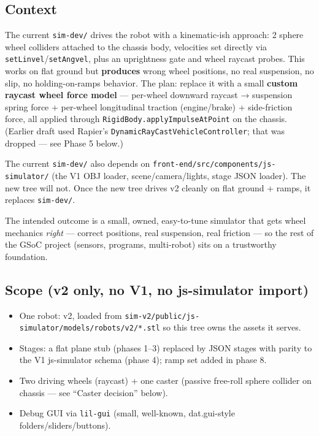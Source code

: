 \documentclass[
]{article}
\providecommand{\tightlist}{%
  \setlength{\itemsep}{0pt}\setlength{\parskip}{0pt}}
\begin{document}
\subsection{Context}\label{context}

The current \texttt{sim-dev/} drives the robot with a kinematic-ish
approach: 2 sphere wheel colliders attached to the chassis body,
velocities set directly via \texttt{setLinvel}/\texttt{setAngvel}, plus
an uprightness gate and wheel raycast probes. This works on flat ground
but \textbf{produces} wrong wheel positions, no real suspension, no
slip, no holding-on-ramps behavior. The plan: replace it with a small
\textbf{custom raycast wheel force model} --- per-wheel downward raycast
→ suspension spring force + per-wheel longitudinal traction
(engine/brake) + side-friction force, all applied through
\texttt{RigidBody.applyImpulseAtPoint} on the chassis. (Earlier draft
used Rapier's \texttt{DynamicRayCastVehicleController}; that was dropped
--- see Phase 5 below.)

The current \texttt{sim-dev/} also depends on
\texttt{front-end/src/components/js-simulator/} (the V1 OBJ loader,
scene/camera/lights, stage JSON loader). The new tree will not. Once the
new tree drives v2 cleanly on flat ground + ramps, it replaces
\texttt{sim-dev/}.

The intended outcome is a small, owned, easy-to-tune simulator that gets
wheel mechanics \emph{right} --- correct positions, real suspension,
real friction --- so the rest of the GSoC project (sensors, programs,
multi-robot) sits on a trustworthy foundation.

\subsection{Scope (v2 only, no V1, no js-simulator
import)}\label{scope-v2-only-no-v1-no-js-simulator-import}

\begin{itemize}
\tightlist
\item
  One robot: v2, loaded from
  \texttt{sim-v2/public/js-simulator/models/robots/v2/*.stl} so this
  tree owns the assets it serves.
\item
  Stages: a flat plane stub (phases 1--3) replaced by JSON stages with
  parity to the V1 js-simulator schema (phase 4); ramp set added in
  phase 8.
\item
  Two driving wheels (raycast) + one caster (passive free-roll sphere
  collider on chassis --- see ``Caster decision'' below).
\item
  Debug GUI via \texttt{lil-gui} (small, well-known, dat.gui-style
  folders/sliders/buttons).
\end{itemize}
\end{document}
